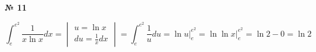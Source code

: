 \documentclass{article}
\begin{document}
\textbf{№ 11} 

$$ \int_{e}^{e^2} \frac{1}{x\ln{x}} dx 
= \begin{vmatrix} u = \ln{x} \\
                 du = \frac{1}{x}dx \end{vmatrix}
= \int_{e}^{e^2} \frac{1}{u}du 
= \ln{u} \bigg\vert_{e}^{e^2} 
= \ln{\ln{x}} \bigg\vert_{e}^{e^2} 
= \ln{2} - 0
= \ln{2} $$
\end{document}
